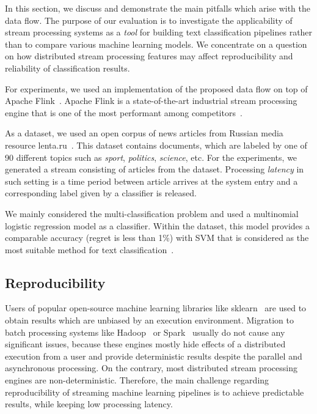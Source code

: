 \label {fs-discussion}

In this section, we discuss and demonstrate the main pitfalls which arise with the data flow. The purpose of our evaluation is to investigate the applicability of stream processing systems as a {\em tool} for building text classification pipelines rather than to compare various machine learning models. We concentrate on a question on how distributed stream processing features may affect reproducibility and reliability of classification results.

For experiments, we used an implementation of the proposed data flow on top of Apache Flink~\cite{Carbone:2017:SMA:3137765.3137777}. Apache Flink is a state-of-the-art industrial stream processing engine that is one of the most performant among competitors~\cite{karimov2018benchmarking, S7530084}. 

As a dataset, we used an open corpus of news articles from Russian media resource lenta.ru~\cite{lentaru}. This dataset contains documents, which are labeled by one of 90 different topics such as {\em sport}, {\em politics}, {\em science}, etc. For the experiments, we generated a stream consisting of articles from the dataset. Processing {\em latency} in such setting is a time period between article arrives at the system entry and a corresponding label given by a classifier is released. 

We mainly considered the multi-classification problem and used a multinomial logistic regression model as a classifier. Within the dataset, this model provides a comparable accuracy (regret is less than 1\%) with SVM that is considered as the most suitable method for text classification~\cite{Kuralenok:2018:CEV:3269206.3271789}.

\subsection{Reproducibility}

Users of popular open-source machine learning libraries like sklearn~\cite{sklearn_api} are used to obtain results which are unbiased by an execution environment. Migration to batch processing systems like Hadoop~\cite{hadoop2009hadoop} or Spark~\cite{Zaharia:2016:ASU:3013530.2934664} usually do not cause any significant issues, because these engines mostly hide effects of a distributed execution from a user and provide deterministic results despite the parallel and asynchronous processing. On the contrary, most distributed stream processing engines are non-deterministic. Therefore, the main challenge regarding reproducibility of streaming machine learning pipelines is to achieve predictable results, while keeping low processing latency.

